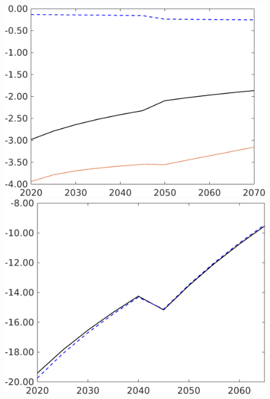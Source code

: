 \begin{figure}[h!!]
\begin{minipage}[]{0.32\textwidth}
	\end{minipage}
	\begin{minipage}[]{0.32\textwidth}
		\includegraphics[width=1\textwidth]{../../codding_model/own_basedOnFried/optimalPol_190722_tidiedUp/figures/all_10Aout22/hl_PercentageLfDynNT_Target_regime3_spillover0_noskill0_sep1_xgrowth0_etaa0.79_lgd0.png}
	\end{minipage}
	\begin{minipage}[]{0.32\textwidth}
		\includegraphics[width=1\textwidth]{../../codding_model/own_basedOnFried/optimalPol_190722_tidiedUp/figures/all_10Aout22/gAagg_PercentageLfDynNT_noeff_Target_regime3_spillover0_noskill0_sep1_xgrowth0_etaa0.79_lgd0.png}

\end{minipage}
\end{figure}
